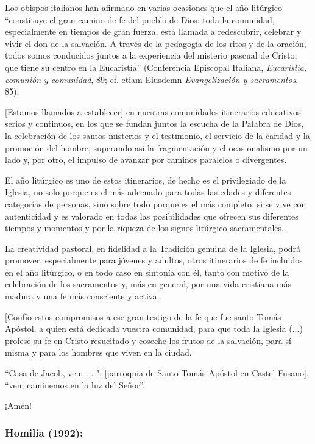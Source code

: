 Los obispos italianos han afirmado en varias ocasiones que el año
litúrgico ``constituye el gran camino de fe del pueblo de Dios: toda la
comunidad, especialmente en tiempos de gran fuerza, está llamada a
redescubrir, celebrar y vivir el don de la salvación. A través de la
pedagogía de los ritos y de la oración, todos somos conducidos juntos a
la experiencia del misterio pascual de Cristo, que tiene su centro en la
Eucaristía'' (Conferencia Episcopal Italiana, \emph{Eucaristía, comunión
	y comunidad}, 89; cf. etiam Eiusdemn \emph{Evangelización y
	sacramentos}, 85).

{[}Estamos llamados a establecer{]} en nuestras comunidades itinerarios
educativos serios y continuos, en los que se fundan juntos la escucha de
la Palabra de Dios, la celebración de los santos misterios y el
testimonio, el servicio de la caridad y la promoción del hombre,
superando así la fragmentación y el ocasionalismo por un lado y, por
otro, el impulso de avanzar por caminos paralelos o divergentes.

El año litúrgico es uno de estos itinerarios, de hecho es el
privilegiado de la Iglesia, no solo porque es el más adecuado para todas
las edades y diferentes categorías de personas, sino sobre todo porque
es el más completo, si se vive con autenticidad y es valorado en todas
las posibilidades que ofrecen sus diferentes tiempos y momentos y por la
riqueza de los signos litúrgico\emph{-}sacramentales.

La creatividad pastoral, en fidelidad a la Tradición genuina de la
Iglesia, podrá promover, especialmente para jóvenes y adultos, otros
itinerarios de fe incluidos en el año litúrgico, o en todo caso en
sintonía con él, tanto con motivo de la celebración de los sacramentos
y, más en general, por una vida cristiana más madura y una fe más
consciente y activa.

{[}Confío estos compromisos a ese gran testigo de la fe que fue santo
Tomás Apóstol, a quien está dedicada vuestra comunidad, para que toda la
Iglesia (...) profese su fe en Cristo resucitado y coseche los frutos de
la salvación, para sí misma y para los hombres que viven en la ciudad.

``Casa de Jacob, ven. . . "; {[}parroquia de Santo Tomás Apóstol en
Castel Fusano{]}, ``ven, caminemos en la luz del Señor''.

¡Amén!

\subsubsection{Homilía (1992): }

